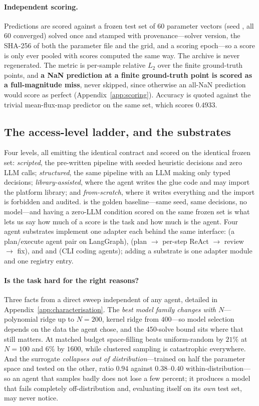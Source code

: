 \paragraph{Independent scoring.}
Predictions are scored against a frozen test set of 60 parameter vectors (seed
, all 60 converged) solved once and stamped with
provenance---solver version, the SHA-256 of both the parameter file and the grid, and a
scoring epoch---so a score is only ever pooled with scores computed the same
way. The archive is never regenerated. The metric is per-sample relative $L_2$
over the finite ground-truth points, and \textbf{a NaN prediction at a finite
ground-truth point is scored as a full-magnitude miss}, never skipped, since
otherwise an all-NaN prediction would score as perfect
(Appendix~\ref{app:scoring}). Accuracy is quoted against the trivial
mean-flux-map predictor on the same set, which scores $0.4933$.

\subsection{The access-level ladder, and the substrates}
\label{sec:ladder}

Four levels, all emitting the identical contract and scored on the identical
frozen set: \Lzero{} \emph{scripted}, the pre-written pipeline with seeded
heuristic decisions and zero LLM calls; \Lone{} \emph{structured}, the same
pipeline with an LLM making only typed decisions; \Ltwo{}
\emph{library-assisted}, where the agent writes the glue code and may import the
platform library; and \Lthree{} \emph{from-scratch}, where it writes everything
and the import is forbidden and audited. \Lzero{} is the golden baseline---same
seed, same decisions, no model---and having a zero-LLM condition scored on the
same frozen set is what lets us say how much of a score is the task and how much
is the agent. Four agent substrates implement one adapter each behind the same
interface:  (a plan/execute agent pair on LangGraph),  (plan
$\rightarrow$ per-step ReAct $\rightarrow$ review $\rightarrow$ fix), and
 and  (CLI coding agents); adding a substrate is one adapter
module and one registry entry.

\paragraph{Is the task hard for the right reasons?}
\label{sec:characterisation}
Three facts from a direct sweep independent of any agent, detailed in
Appendix~\ref{app:characterisation}. The \emph{best model family changes with
$N$}---polynomial ridge up to $N = 200$, kernel ridge from $400$---so model
selection depends on the data the agent chose, and the 450-solve bound sits
where that still matters. At matched budget space-filling beats uniform-random
by $21\%$ at $N = 100$ and $6\%$ by $1600$, while clustered sampling is
catastrophic everywhere. And the surrogate \emph{collapses out of
distribution}---trained on half the parameter space and tested on the other,
ratio $0.94$ against $0.38$--$0.40$ within-distribution---so an agent that
samples badly does not lose a few percent; it produces a model that fails
completely off-distribution and, evaluating itself on its \emph{own} test set,
may never notice.
